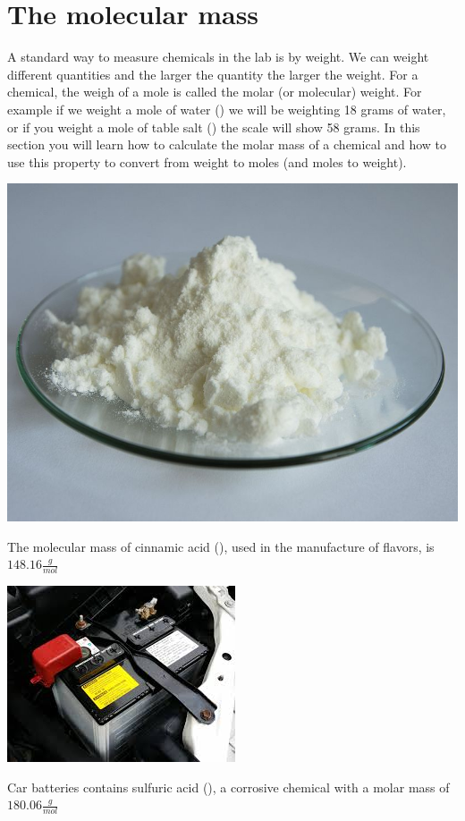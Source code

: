 \documentclass[main.tex]{subfiles}
\begin{document}
\section{The molecular mass}
A standard way to measure chemicals in the lab is by weight. We can weight different quantities and the larger the quantity the larger the weight. For a chemical, the weigh of a mole is called the molar (or molecular) weight. For example if we weight a mole of water () we will be weighting 18 grams of water, or if you weight a mole of table salt () the scale will show 58 grams. In this section you will learn how to calculate the molar mass of a chemical and how to use this property to convert from weight to moles (and moles to weight).
\sloppy 
\begin{marginfigure}[-6cm]%
      \includegraphics{chapter7/figure5}
      \label{fig:marginfig}
      \caption{The molecular mass of cinnamic acid (), used in the manufacture of flavors, is $148.16 \frac{g}{mol}$ }
	\end{marginfigure}%
\begin{marginfigure}[2cm]%
      \includegraphics{chapter7/figure6}
      \label{fig:marginfig}
      \caption{Car batteries contains sulfuric acid (), a corrosive chemical with a molar mass of $180.06 \frac{g}{mol}$ }
	\end{marginfigure}%
\end{document}
